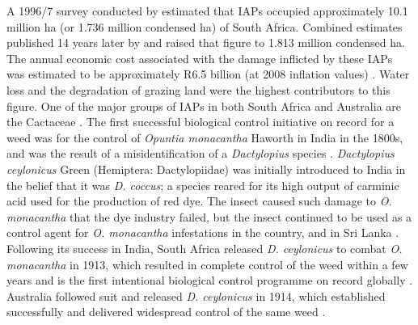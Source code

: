 \clearpage
\noindent A 1996/7 survey conducted by \citet{Maitre2000} estimated that IAPs occupied approximately 10.1 million ha (or 1.736 million condensed ha) of South Africa. Combined estimates published 14 years later by \citet{Kotze2010} and \citet{VandenBerg2010} raised that figure to 1.813 million condensed ha. The annual economic cost associated with the damage inflicted by these IAPs was estimated to be approximately R6.5 billion (at 2008 inflation values) \citep{DeLange2010}. Water loss and the degradation of grazing land were the highest contributors to this figure.\newline 
One of the major groups of IAPs in both South Africa and Australia are the Cactaceae \citep{Moran1991BiologicalAfrica, Zimmermann2009, Klein2011,Paterson2011BiologicalAfrica}. The first successful biological control initiative on record for a weed was for the control of \textit{Opuntia monacantha} Haworth in India in the 1800s, and was the result of a misidentification of a \textit{Dactylopius} species \citep{Greenfield2005,Zimmermann2009}. \textit{Dactylopius ceylonicus} Green (Hemiptera: Dactylopiidae) was initially introduced to India in the belief that it was \textit{D. coccus}; a species reared for its high output of carminic acid used for the production of red dye. The insect caused such damage to \textit{O. monacantha} that the dye industry failed, but the insect continued to be used as a control agent for \textit{O. monacantha} infestations in the country, and in Sri Lanka \citep{Zimmermann2009}. Following its success in India, South Africa released \textit{D. ceylonicus} to combat \textit{O. monacantha} in 1913, which resulted in complete control of the weed within a few years and is the first intentional biological control programme on record globally \citep{lounsbury1915,Zimmermann2004BiologicalWater, Paterson2011BiologicalAfrica}. Australia followed suit and released \textit{D. ceylonicus} in 1914, which established successfully and delivered widespread control of the same weed \citep{Winston2014BiologicalWeeds.}. \\
